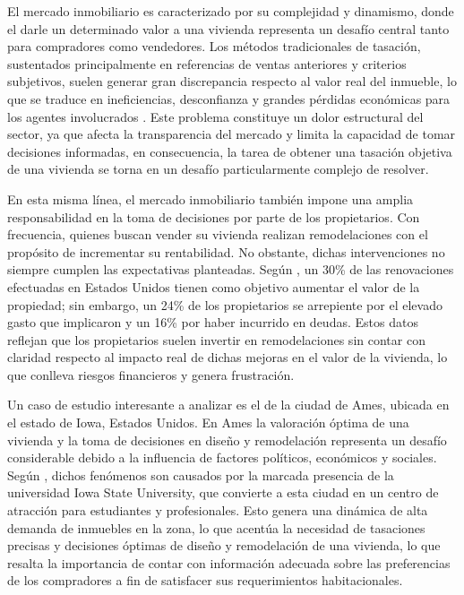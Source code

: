 El mercado inmobiliario es caracterizado por su complejidad y dinamismo, donde el darle un determinado valor a una vivienda representa un desafío central tanto para compradores como vendedores. Los métodos tradicionales de tasación, sustentados principalmente en referencias de ventas anteriores y criterios subjetivos, suelen generar gran discrepancia respecto al valor real del inmueble, lo que se traduce en ineficiencias, desconfianza y grandes pérdidas económicas para los agentes involucrados \cite{evans2019}. Este problema constituye un dolor estructural del sector, ya que afecta la transparencia del mercado y limita la capacidad de tomar decisiones informadas, en consecuencia, la tarea de obtener una tasación objetiva de una vivienda se torna en un desafío particularmente complejo de resolver.

En esta misma línea, el mercado inmobiliario también impone una amplia responsabilidad en la toma de decisiones por parte de los propietarios. Con frecuencia, quienes buscan vender su vivienda realizan remodelaciones con el propósito de incrementar su rentabilidad. No obstante, dichas intervenciones no siempre cumplen las expectativas planteadas. Según , un 30\% de las renovaciones efectuadas en Estados Unidos tienen como objetivo aumentar el valor de la propiedad; sin embargo, un 24\% de los propietarios se arrepiente por el elevado gasto que implicaron y un 16\% por haber incurrido en deudas. Estos datos reflejan que los propietarios suelen invertir en remodelaciones sin contar con claridad respecto al impacto real de dichas mejoras en el valor de la vivienda, lo que conlleva riesgos financieros y genera frustración.

Un caso de estudio interesante a analizar es el de la ciudad de Ames, ubicada en el estado de Iowa, Estados Unidos. En Ames la valoración óptima de una vivienda y la toma de decisiones en diseño y remodelación representa un desafío considerable debido a la influencia de factores políticos, económicos y sociales. Según , dichos fenómenos son causados por la marcada presencia de la universidad Iowa State University, que convierte a esta ciudad en un centro de atracción para estudiantes y profesionales. Esto genera una dinámica de alta demanda de inmuebles en la zona, lo que acentúa la necesidad de tasaciones precisas y decisiones óptimas de diseño y remodelación de una vivienda, lo que resalta la importancia de contar con información adecuada sobre las preferencias de los compradores a fin de satisfacer sus requerimientos habitacionales.

